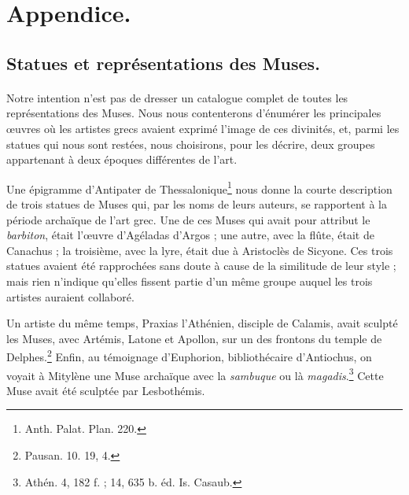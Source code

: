 \documentclass[landscape, a4paper, 11pt, oneside, polutonikogreek, french]{article}
\begin{document}
\section{Appendice.}
\subsection{Statues et représentations des Muses.}
\paragraph{}
Notre intention n'est pas de dresser un catalogue complet de toutes les représentations des Muses. Nous nous contenterons d'énumérer les principales œuvres où les artistes grecs avaient exprimé l'image de ces divinités, et, parmi les statues qui nous sont restées, nous choisirons, pour les décrire, deux groupes appartenant à deux époques différentes de l'art.

Une épigramme d'Antipater de Thessalonique\footnote{Anth. Palat. Plan. 220.} nous donne la courte description de trois statues de Muses qui, par les noms de leurs auteurs, se rapportent à la période archaïque de l'art grec. Une de ces Muses qui avait pour attribut le \emph{barbiton}, était l'œuvre d'Agéladas d'Argos ; une autre, avec la flûte, était de Canachus ; la troisième, avec la lyre, était due à Aristoclès de Sicyone. Ces trois statues avaient été rapprochées sans doute à cause de la similitude de leur style ; mais rien n'indique qu'elles fissent partie d'un même groupe auquel les trois artistes auraient collaboré.

Un artiste du même temps, Praxias l'Athénien, disciple de Calamis, avait sculpté les Muses, avec Artémis, Latone et Apollon, sur un des frontons du temple de Delphes.\footnote{Pausan. 10. 19, 4.} Enfin, au témoignage d'Euphorion, bibliothécaire d'Antiochus, on voyait à Mitylène une Muse archaïque avec la \emph{sambuque} ou là \emph{magadis}.\footnote{Athén. 4, 182 f. ; 14, 635 b. éd. Is. Casaub.} Cette Muse avait été sculptée par Lesbothémis.
\end{document}
